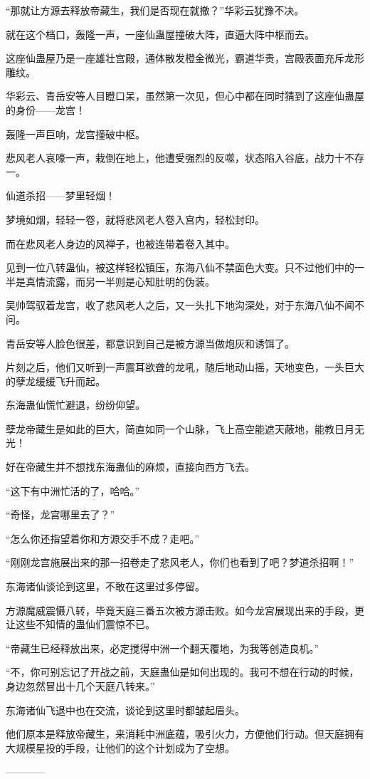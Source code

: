 \begin{this_body}
“那就让方源去释放帝藏生，我们是否现在就撤？”华彩云犹豫不决。

就在这个档口，轰隆一声，一座仙蛊屋撞破大阵，直逼大阵中枢而去。

这座仙蛊屋乃是一座雄壮宫殿，通体散发橙金微光，霸道华贵，宫殿表面充斥龙形雕纹。

华彩云、青岳安等人目瞪口呆，虽然第一次见，但心中都在同时猜到了这座仙蛊屋的身份——龙宫！

轰隆一声巨响，龙宫撞破中枢。

悲风老人哀嚎一声，栽倒在地上，他遭受强烈的反噬，状态陷入谷底，战力十不存一。

仙道杀招——梦里轻烟！

梦境如烟，轻轻一卷，就将悲风老人卷入宫内，轻松封印。

而在悲风老人身边的风禅子，也被连带着卷入其中。

见到一位八转蛊仙，被这样轻松镇压，东海八仙不禁面色大变。只不过他们中的一半是真情流露，而另一半则是心知肚明的伪装。

吴帅驾驭着龙宫，收了悲风老人之后，又一头扎下地沟深处，对于东海八仙不闻不问。

青岳安等人脸色很差，都意识到自己是被方源当做炮灰和诱饵了。

片刻之后，他们又听到一声震耳欲聋的龙吼，随后地动山摇，天地变色，一头巨大的孽龙缓缓飞升而起。

东海蛊仙慌忙避退，纷纷仰望。

孽龙帝藏生是如此的巨大，简直如同一个山脉，飞上高空能遮天蔽地，能教日月无光！

好在帝藏生并不想找东海蛊仙的麻烦，直接向西方飞去。

“这下有中洲忙活的了，哈哈。”

“奇怪，龙宫哪里去了？”

“怎么你还指望着你和方源交手不成？走吧。”

“刚刚龙宫施展出来的那一招卷走了悲风老人，你们也看到了吧？梦道杀招啊！”

东海诸仙谈论到这里，不敢在这里过多停留。

方源魔威震慑八转，毕竟天庭三番五次被方源击败。如今龙宫展现出来的手段，更让这些不知情的蛊仙们震惊不已。

“帝藏生已经释放出来，必定搅得中洲一个翻天覆地，为我等创造良机。”

“不，你可别忘记了开战之前，天庭蛊仙是如何出现的。我可不想在行动的时候，身边忽然冒出十几个天庭八转来。”

东海诸仙飞退中也在交流，谈论到这里时都皱起眉头。

他们原本是释放帝藏生，来消耗中洲底蕴，吸引火力，方便他们行动。但天庭拥有大规模星投的手段，让他们的这个计划成为了空想。

------------

\end{this_body}

